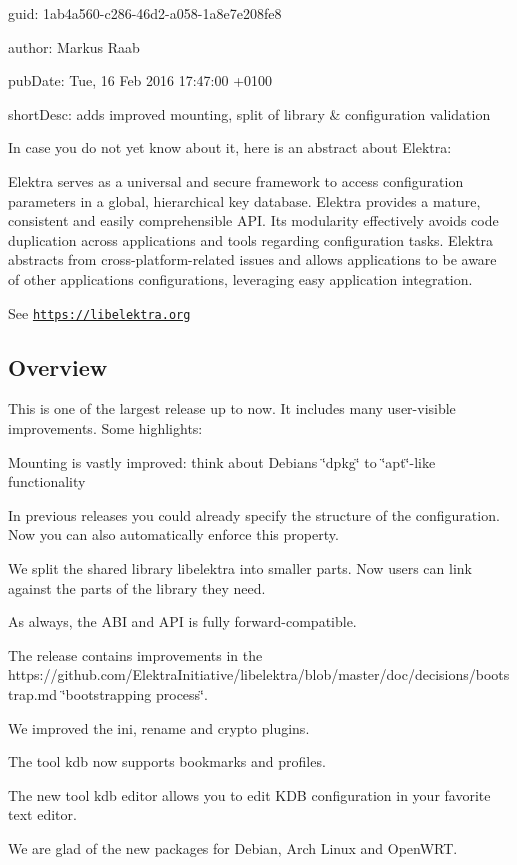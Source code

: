 
\begin{DoxyItemize}
\item guid\+: 1ab4a560-\/c286-\/46d2-\/a058-\/1a8e7e208fe8
\item author\+: Markus Raab
\item pub\+Date\+: Tue, 16 Feb 2016 17\+:47\+:00 +0100
\item short\+Desc\+: adds improved mounting, split of library \& configuration validation
\end{DoxyItemize}

In case you do not yet know about it, here is an abstract about Elektra\+:

Elektra serves as a universal and secure framework to access configuration parameters in a global, hierarchical key database. Elektra provides a mature, consistent and easily comprehensible A\+PI. Its modularity effectively avoids code duplication across applications and tools regarding configuration tasks. Elektra abstracts from cross-\/platform-\/related issues and allows applications to be aware of other applications\textquotesingle{} configurations, leveraging easy application integration.

See \href{https://libelektra.org}{\tt https\+://libelektra.\+org}

\subsection*{Overview}

This is one of the largest release up to now. It includes many user-\/visible improvements. Some highlights\+:


\begin{DoxyItemize}
\item Mounting is vastly improved\+: think about Debian\textquotesingle{}s \char`\"{}dpkg\char`\"{} to \char`\"{}apt\char`\"{}-\/like functionality
\item In previous releases you could already specify the structure of the configuration. Now you can also automatically enforce this property.
\item We split the shared library {\ttfamily libelektra} into smaller parts. Now users can link against the parts of the library they need.
\item As always, the A\+BI and A\+PI is fully forward-\/compatible.
\item The release contains improvements in the https\+://github.com/\+Elektra\+Initiative/libelektra/blob/master/doc/decisions/bootstrap.\+md \char`\"{}bootstrapping process\char`\"{}.
\item We improved the {\ttfamily ini}, {\ttfamily rename} and {\ttfamily crypto} plugins.
\item The tool {\ttfamily kdb} now supports bookmarks and profiles.
\item The new tool {\ttfamily kdb editor} allows you to edit K\+DB configuration in your favorite text editor.
\item We are glad of the new packages for Debian, Arch Linux and Open\+W\+RT.
\end{DoxyItemize}

